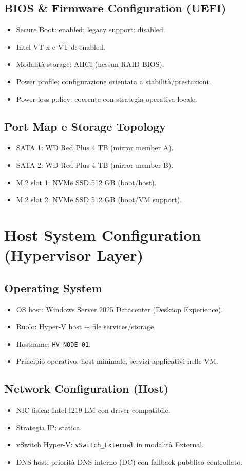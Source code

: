 \documentclass[11pt,a4paper]{article}
\begin{document}
\subsection{BIOS \& Firmware Configuration (UEFI)}
\begin{itemize}
  \item Secure Boot: enabled; legacy support: disabled.
  \item Intel VT-x e VT-d: enabled.
  \item Modalità storage: AHCI (nessun RAID BIOS).
  \item Power profile: configurazione orientata a stabilità/prestazioni.
  \item Power loss policy: coerente con strategia operativa locale.
\end{itemize}

\subsection{Port Map e Storage Topology}
\begin{itemize}
  \item SATA 1: WD Red Plus 4 TB (mirror member A).
  \item SATA 2: WD Red Plus 4 TB (mirror member B).
  \item M.2 slot 1: NVMe SSD 512 GB (boot/host).
  \item M.2 slot 2: NVMe SSD 512 GB (boot/VM support).
\end{itemize}

\section{Host System Configuration (Hypervisor Layer)}

\subsection{Operating System}
\begin{itemize}
  \item OS host: Windows Server 2025 Datacenter (Desktop Experience).
  \item Ruolo: Hyper-V host + file services/storage.
  \item Hostname: \texttt{HV-NODE-01}.
  \item Principio operativo: host minimale, servizi applicativi nelle VM.
\end{itemize}

\subsection{Network Configuration (Host)}
\begin{itemize}
  \item NIC fisica: Intel I219-LM con driver compatibile.
  \item Strategia IP: statica.
  \item vSwitch Hyper-V: \texttt{vSwitch\_External} in modalità External.
  \item DNS host: priorità DNS interno (DC) con fallback pubblico controllato.
\end{itemize}
\end{document}
